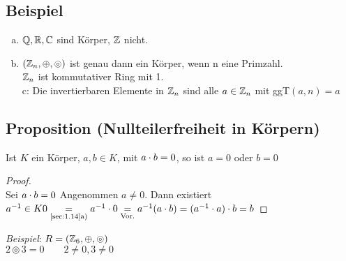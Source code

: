 \subsection{Beispiel}
\begin{enumerate}[a)]
\item $\mathbb{Q},\mathbb{R},\mathbb{C}$ sind Körper, $\mathbb{Z}$ nicht.
\item $(\mathbb{Z}_n,\oplus,\circledcirc)$ ist genau dann ein Körper, wenn n eine Primzahl.\\
$\mathbb{Z}_n$ ist kommutativer Ring mit 1.\\
c: Die invertierbaren Elemente in $\mathbb{Z}_n$ sind alle $a \in \mathbb{Z}_n$ mit ggT$(a,n)=a$
\end{enumerate}
\subsection{Proposition (Nullteilerfreiheit in Körpern)}\label{sec:1.18}
Ist $K$ ein Körper, $a,b \in K$, mit $a \cdot b = 0$, so ist $a = 0$ oder $b = 0$
\begin{proof}\ \\
Sei $a \cdot b = 0$ Angenommen $a \ne 0$.
Dann existiert $a^{-1} \in K\\
0 \underset{\text{\ref{sec:1.14}a)} }{=} a^{-1} \cdot 0 \underset{\text{Vor.} }{=} a^{-1}(a \cdot b) = (a^{-1} \cdot a)\cdot b = b$
\end{proof} 
\noindent\emph{Beispiel}: $R = (\mathbb{Z}_6,\oplus,\circledcirc)$\\
\phantom{Beispiel:} $2\circledcirc3=0\qquad 2 \ne 0, 3\ne 0$
